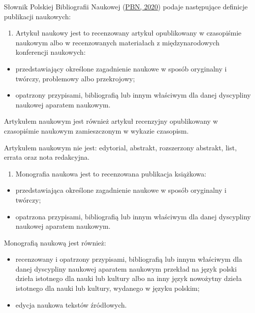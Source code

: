 \documentclass[
  12pt,
]{article}
\providecommand{\tightlist}{%
  \setlength{\itemsep}{0pt}\setlength{\parskip}{0pt}}
\begin{document}
Słownik Polskiej Bibliografii Naukowej
(\protect\hyperlink{ref-pbn2020}{PBN, 2020}) podaje następujące
definicje publikacji naukowych:

\begin{enumerate}
\def\labelenumi{\arabic{enumi}.}
\tightlist
\item
  Artykuł naukowy jest to recenzowany artykuł opublikowany w czasopiśmie
  naukowym albo w recenzowanych materiałach z międzynarodowych
  konferencji naukowych:
\end{enumerate}

\begin{itemize}
\tightlist
\item
  przedstawiający określone zagadnienie naukowe w sposób oryginalny i
  twórczy, problemowy albo przekrojowy;
\item
  opatrzony przypisami, bibliografią lub innym właściwym dla danej
  dyscypliny naukowej aparatem naukowym.
\end{itemize}

Artykułem naukowym jest również artykuł recenzyjny opublikowany w
czasopiśmie naukowym zamieszczonym w wykazie czasopism.

Artykułem naukowym nie jest: edytorial, abstrakt, rozszerzony abstrakt,
list, errata oraz nota redakcyjna.

\begin{enumerate}
\def\labelenumi{\arabic{enumi}.}
\setcounter{enumi}{1}
\tightlist
\item
  Monografia naukowa jest to recenzowana publikacja książkowa:
\end{enumerate}

\begin{itemize}
\tightlist
\item
  przedstawiająca określone zagadnienie naukowe w sposób oryginalny i
  twórczy;
\item
  opatrzona przypisami, bibliografią lub innym właściwym dla danej
  dyscypliny naukowej aparatem naukowym.
\end{itemize}

Monografią naukową jest również:

\begin{itemize}
\tightlist
\item
  recenzowany i opatrzony przypisami, bibliografią lub innym właściwym
  dla danej dyscypliny naukowej aparatem naukowym przekład na język
  polski dzieła istotnego dla nauki lub kultury albo na inny język
  nowożytny dzieła istotnego dla nauki lub kultury, wydanego w języku
  polskim;
\item
  edycja naukowa tekstów źródłowych.
\end{itemize}
\end{document}
